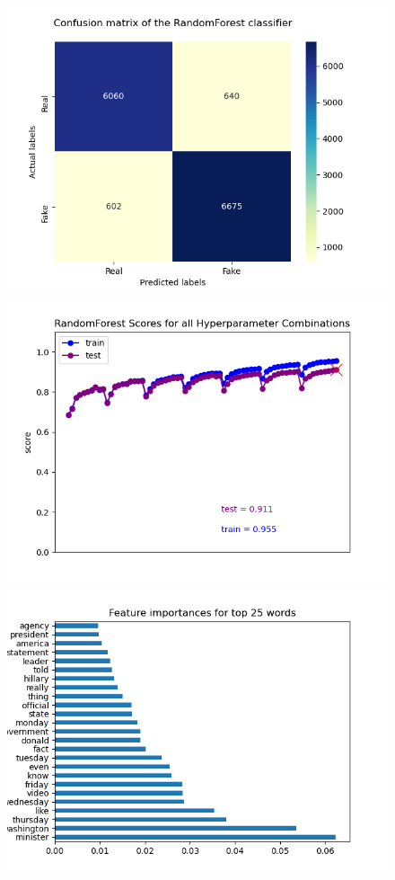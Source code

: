 \documentclass[10pt,twocolumn,letterpaper]{article}
\begin{document}
\begin{figure}[h]
   \begin{center}
        \includegraphics[width=\linewidth]{Latex_Report/report/Graphs/RF/confusion_matrix.png}
        \includegraphics[width=\linewidth]{Latex_Report/report/Graphs/RF/scores_plot.png}
        \includegraphics[width=\linewidth]{Latex_Report/report/Graphs/RF/feature_importances.png}

\end{center}
\end{figure}
\end{document}
